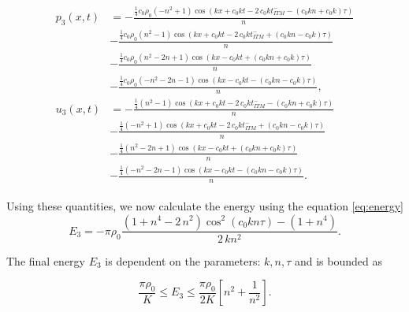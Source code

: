 \begin{align}
    \begin{split}
        p_3\left(x, t\right) & = -\frac{{\frac{1}{4}c_{0}\rho_{0}\left( -n^{2} + 1\right)} \cos\left(k x + c_{0} k t - 2 \, c_{0} k \mathit{t_{ITM}^-} - {\left(c_{0} k n + c_{0} k\right)} \tau\right)}{n} \\
        & - \frac{{\frac{1}{4}c_0\rho_0\left(n^{2} - 1\right)} \cos\left(k x + c_{0} k t - 2 \, c_{0} k \mathit{t_{ITM}^-} + {\left(c_{0} k n - c_{0} k\right)} \tau\right)}{n} \\
        & - \frac{{\frac{1}{4}c_0\rho_0\left(n^{2} - 2n + 1\right)} \cos\left(kx -c_{0} k t + {\left(c_{0} k n + c_{0} k\right)} \tau\right)}{n} \\
        & - \frac{{\frac{1}{4}c_0\rho_0\left(-n^{2} - 2n - 1\right)} \cos\left(kx-c_{0} k t - {\left(c_{0} k n - c_{0} k\right)} \tau\right)}{n}, \\
        u_3\left(x, t\right) & =  -\frac{{\frac{1}{4}\left(n^{2} - 1\right)} \cos\left( k x + c_{0} k t - 2 \, c_{0} k \mathit{t_{ITM}^-} - {\left(c_{0} k n + c_{0} k\right)} \tau\right)}{n} \\
        & - \frac{{\frac{1}{4}\left(-n^{2} + 1\right)} \cos\left(kx + c_{0} k t - 2 \, c_{0} k \mathit{t_{ITM}^-} + {\left(c_{0} k n - c_{0} k\right)} \tau\right)}{n} \\
        & - \frac{{\frac{1}{4}\left(n^{2} - 2n + 1\right)} \cos\left(kx -c_{0} k t + {\left(c_{0} k n + c_{0} k\right)} \tau\right)}{n} \\
        & - \frac{{\frac{1}{4}\left(-n^{2} - 2n - 1\right)} \cos\left(kx -c_{0} k t - {\left(c_{0} k n - c_{0} k\right)} \tau\right)}{n} .
    \end{split}
\end{align}

Using these quantities, we now calculate the energy using the equation \ref{eq:energy}
\begin{equation}
    E_3 = -\pi \rho_0\frac{{\left(1 + n^{4} - 2 \, n^{2}\right)} \cos^{2}\left(c_{0} k n \tau\right) - {\left(1 + n^{4}\right)}}{2 \, k n^{2}}.
\end{equation}

The final energy $E_3$ is dependent on the parameters: $k, n, \tau$ and is bounded as

\begin{equation}
    \frac{\pi \rho_0}{K} \leq E_3 \leq \frac{\pi \rho_0}{2K}\left[n^2 + \frac{1}{n^2}\right] .
\end{equation}

